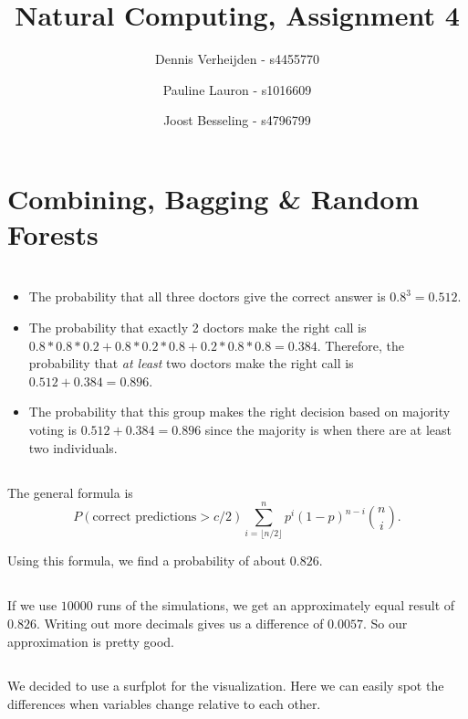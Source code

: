 \documentclass[11pt]{article}
\title{Natural Computing, Assignment 4}
\author{Dennis Verheijden - s4455770 \and Pauline Lauron - s1016609 \and Joost Besseling - s4796799}
\newcommand{\floor}[1]{\lfloor #1 \rfloor}
\begin{document}
\maketitle

\section*{Combining, Bagging \& Random Forests}
\section{}
\subsection{}
\begin{itemize}
	\item 
	The probability that all three doctors give the correct answer is $ 0.8^3 = 0.512$. 
	\item 
	The probability that exactly 2 doctors make the right call is $0.8*0.8*0.2 + 0.8*0.2*0.8 + 0.2*0.8*0.8 = 0.384$. Therefore, the probability that \emph{at least} two doctors make the right call is $0.512 + 0.384 = 0.896$.
	\item  The probability that this group makes the right decision based on majority voting is $0.512 + 0.384 = 0.896$ since the majority is when there are at least two individuals. 
\end{itemize}


\subsection{}
The general formula is 
\[
	P(\text{correct predictions} > c/2) \sum_{i = \floor{n/2}}^{n} p^{i}  (1-p)^{n-i}  \binom{n}{i}.
\]

Using this formula, we find a probability of about $0.826$.

\subsection{}
If we use $10000$ runs of the simulations, we get an approximately equal result of $0.826$. Writing out more decimals gives us a difference of $0.0057$. So our approximation is pretty good.

\subsection{}
We decided to use a surfplot for the visualization. Here we can easily spot the differences when variables change relative to each other.
\end{document}
